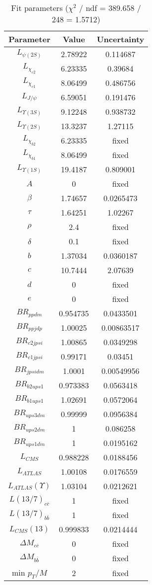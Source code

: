 \begin{table}
\centering
\begin{tabular}{c|c|c}
Parameter & Value & Uncertainty \\
\hline
$L_{\psi(2S)}$ & 2.78922 & 0.114687 \\
$L_{\chi_{c2}}$ & 6.23335 & 0.39684 \\
$L_{\chi_{c1}}$ & 8.06499 & 0.486756 \\
$L_{J/\psi}$ & 6.59051 & 0.191476 \\
$L_{\Upsilon(3S)}$ & 9.12248 & 0.938732 \\
$L_{\Upsilon(2S)}$ & 13.3237 & 1.27115 \\
$L_{\chi_{b2}}$ & 6.23335 & fixed \\
$L_{\chi_{b1}}$ & 8.06499 & fixed \\
$L_{\Upsilon(1S)}$ & 19.4187 & 0.809001 \\
$A$ & 0 & fixed \\
$\beta$ & 1.74657 & 0.0265473 \\
$\tau$ & 1.64251 & 1.02267 \\
$\rho$ & 2.4 & fixed \\
$\delta$ & 0.1 & fixed \\
$b$ & 1.37034 & 0.0360187 \\
$c$ & 10.7444 & 2.07639 \\
$d$ & 0 & fixed \\
$e$ & 0 & fixed \\
$BR_{ppdm}$ & 0.954735 & 0.0433501 \\
$BR_{ppjdp}$ & 1.00025 & 0.00863517 \\
$BR_{c2jpsi}$ & 1.00865 & 0.0349298 \\
$BR_{c1jpsi}$ & 0.99171 & 0.03451 \\
$BR_{jpsidm}$ & 1.0001 & 0.00549956 \\
$BR_{b2ups1}$ & 0.973383 & 0.0563418 \\
$BR_{b1ups1}$ & 1.02691 & 0.0572064 \\
$BR_{ups3dm}$ & 0.99999 & 0.0956384 \\
$BR_{ups2dm}$ & 1 & 0.086258 \\
$BR_{ups1dm}$ & 1 & 0.0195162 \\
$L_{CMS}$ & 0.988228 & 0.0188456 \\
$L_{ATLAS}$ & 1.00108 & 0.0176559 \\
$L_{ATLAS}(\Upsilon)$ & 1.03104 & 0.0212621 \\
$L(13/7)_{c\overline c}$ & 1 & fixed \\
$L(13/7)_{b\overline b}$ & 1 & fixed \\
$L_{CMS}(13)$ & 0.999833 & 0.0214444 \\
$\Delta M_{c\overline c}$ & 0 & fixed \\
$\Delta M_{b\overline b}$ & 0 & fixed \\
min $p_T/M$ & 2 & fixed \\
\end{tabular}
\caption{Fit parameters ($\chi^2$ / ndf = 389.658 / 248 = 1.5712)}
\end{table}
